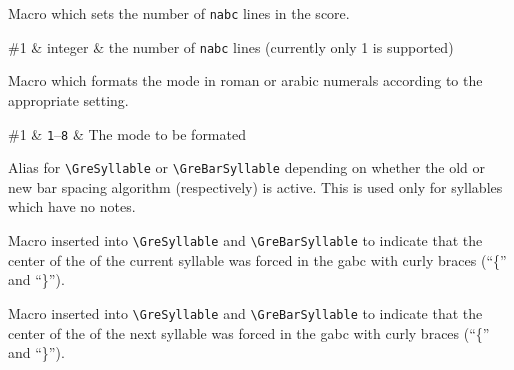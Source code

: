 Macro which sets the number of \texttt{nabc} lines in the score.

\begin{argtable}
  \#1 & integer & the number of \texttt{nabc} lines (currently only 1 is supported)\\
\end{argtable}


Macro which formats the mode in roman or arabic numerals according to the appropriate setting.

\begin{argtable}
  \#1 & \texttt{1}--\texttt{8} & The mode to be formated\\
\end{argtable}

Alias for \verb=\GreSyllable= or \verb=\GreBarSyllable= depending on whether the old or new bar spacing algorithm (respectively) is active.  This is used only for syllables which have no notes.

Macro inserted into \verb=\GreSyllable= and \verb=\GreBarSyllable= to indicate that the center of the of the current syllable was forced in the gabc with curly braces (``\{'' and ``\}'').

Macro inserted into \verb=\GreSyllable= and \verb=\GreBarSyllable= to indicate that the center of the of the next syllable was forced in the gabc with curly braces (``\{'' and ``\}'').


